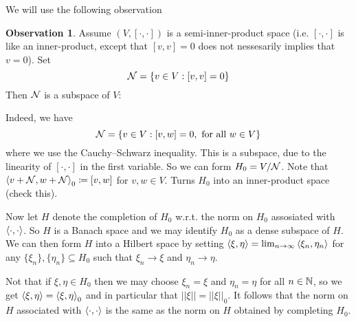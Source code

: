 \documentclass[10pt,english,a4paper]{article}
\theoremstyle{definition}
\newtheorem*{observation}{Observation}
\begin{document}
We will use the following observation
\begin{observation}
    Assume $(V,[\cdot,\cdot])$ is a semi-inner-product space 
(i.e. $[\cdot,\cdot]$ is like an inner-product, except that 
$[v,v] = 0$ does not nessesarily implies that $v=0$).
Set 
\[ \mathcal{N} = \{v \in V : [v,v] = 0\} \]
Then $\mathcal{N}$ is a subspace of $V$:

Indeed, we have 
\[ \mathcal{N} = \{v \in V : [v,w] = 0, \text{ for all }w \in V\} \]
where we use the Cauchy–Schwarz inequality. This is a subspace, due to
the linearity of $[\cdot,\cdot]$ in the first variable.
So we can form $H_0 = V/\mathcal{N}$. Note that 
$\left\langle v +\mathcal{N}, w + \mathcal{N} \right\rangle_0 \coloneqq [v,w]$ for $v,w \in V$. 
Turns $H_0$ into an inner-product space (check this).

Now let $H$ denote the completion of $H_0$ w.r.t. the norm on $H_0$
assosiated with $\left\langle \cdot,\cdot \right\rangle$. So $H$ is a Banach space and we may 
identify $H_0$ as a dense subspace of $H$. We can 
then form $H$ into a Hilbert space by setting 
$\left\langle \xi,\eta \right\rangle = \lim_{n\to\infty} \left\langle \xi_n,\eta_n \right\rangle$ for 
any $\{\xi_n\}, \{\eta_n\}\subseteq H_0$ such that $\xi_n\to \xi$ and 
$\eta_n\to \eta$. 

Not that if $\xi,\eta\in H_0$ then we may choose $\xi_n=\xi$ and $\eta_n =\eta$ for all
$n\in\mathbb{N}$, so we get $\left\langle \xi,\eta \right\rangle = \left\langle \xi,\eta \right\rangle_{0}$ and in particular 
that $||\xi|| = ||\xi||_0$.
It follows that the norm on $H$ associated with $\left\langle \cdot,\cdot \right\rangle$ is the same 
as the norm on $H$ obtained by completing $H_0$.

\end{observation}
\end{document}
